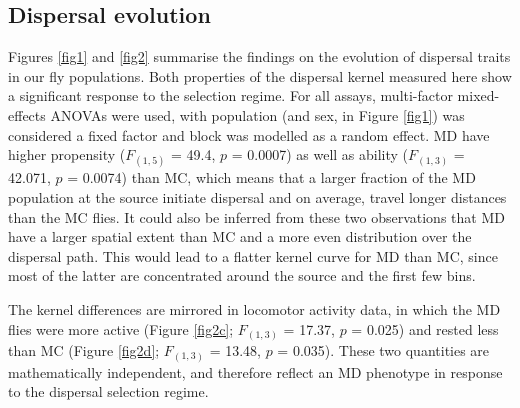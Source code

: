 \documentclass[12pt,onecolumn,twoside]{article}
\begin{document}
	\subsection{Dispersal evolution}
	Figures \ref{fig1} and \ref{fig2} summarise the findings on the evolution of dispersal traits in our fly populations. Both properties of the dispersal kernel measured here show a significant response to the selection regime. For all assays, multi-factor mixed-effects ANOVAs were used, with population (and sex, in Figure \ref{fig1}) was considered a fixed factor and block was modelled as a random effect.
	MD have higher propensity ($F_{(1, 5)}$ = 49.4, $p$ = 0.0007) as well as ability ($F_{(1, 3)}$ = 42.071, $p$ = 0.0074) than MC, which means that a larger fraction of the MD population at the source initiate dispersal and on average, travel longer distances than the MC flies. It could also be inferred from these two observations that MD have a larger spatial extent than MC and a more even distribution over the dispersal path. This would lead to a flatter kernel curve for MD than MC, since most of the latter are concentrated around the source and the first few bins.

	The kernel differences are mirrored in locomotor activity data, in which the MD flies were more active (Figure \ref{fig2c}; $F_{(1, 3)}$ = 17.37, $p$ = 0.025) and rested less than MC (Figure \ref{fig2d}; $F_{(1, 3)}$ = 13.48, $p$ = 0.035). These two quantities are mathematically independent, and therefore reflect an MD phenotype in response to the dispersal selection regime.
\end{document}

